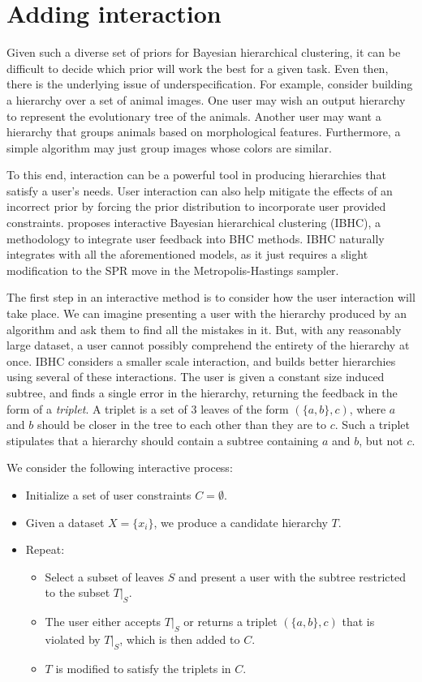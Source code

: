 \documentclass{article}
\begin{document}
\section{Adding interaction}

Given such a diverse set of priors
for Bayesian hierarchical clustering,
it can be difficult to decide
which prior will work the best
for a given task.
Even then, there is the underlying
issue of underspecification.
For example, consider building a hierarchy
over a set of animal images. One user
may wish an output hierarchy to represent
the evolutionary tree of the animals.
Another user may want a hierarchy
that groups animals based on morphological features.
Furthermore, a simple algorithm may just
group images whose colors are similar.

To this end, interaction can be a powerful
tool in producing hierarchies that satisfy
a user's needs. 
User interaction can also help
mitigate the effects of an incorrect
prior by forcing the prior distribution
to incorporate user provided constraints.
\cite{Vikram2016} proposes
interactive Bayesian hierarchical clustering (IBHC),
a methodology to integrate
user feedback into BHC methods.
IBHC naturally integrates with
all the aforementioned models, as it
just requires a slight modification to the
SPR move in the Metropolis-Hastings sampler.

The first step in an interactive method is
to consider how the user interaction will take place.
We can imagine presenting a user
with the hierarchy produced by an algorithm
and ask them to find all the mistakes in it.
But, with any reasonably large dataset, a user
cannot possibly comprehend the entirety of the hierarchy
at once. IBHC considers a smaller scale interaction, and builds
better hierarchies using
several of these interactions.
The user is given a constant size induced subtree,
and finds a single error in the hierarchy,
returning the feedback in the form of a \emph{triplet}.
A triplet is a set of 3 leaves of the form $(\{a, b\}, c)$, 
where $a$ and $b$ should be 
closer in the tree to each other than they are to $c$.
Such a triplet stipulates that a hierarchy should contain
a subtree containing $a$ and $b$, but not $c$.

We consider the following interactive process:

\begin{itemize}
  \item Initialize a set of user constraints $C = \emptyset$.
  \item Given a dataset $X = \{x_i\}$,
    we produce a candidate hierarchy $T$.
  \item Repeat:
    \begin{itemize}
      \item Select a subset of leaves $S$ and present a user
        with the subtree restricted to the subset $T|_S$.
      \item The user either accepts $T|_S$ or returns a triplet
        $(\{a, b\}, c)$ that is violated by $T|_S$, which is then added to $C$.
      \item $T$ is modified to satisfy the triplets in $C$.
    \end{itemize}
\end{itemize}
\end{document}
